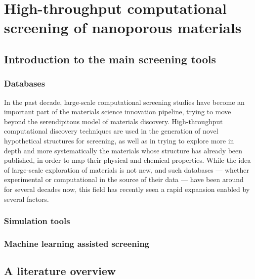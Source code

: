 \documentclass[main]{subfiles}
\begin{document}
\chapter{High-throughput computational screening of nanoporous materials}
\vspace*{-1\baselineskip}


\section{Introduction to the main screening tools}

\subsection{Databases}


In the past decade, large-scale computational screening studies have become an important part of the materials science innovation pipeline,\cite{Hautier_2019, Cole_2020} trying to move beyond the serendipitous model of materials discovery.\cite{Ludwig_2019, Stein_2019} High-throughput computational discovery techniques are used in the generation of novel hypothetical structures for screening,\cite{Wilmer_2011, Boyd_2016} as well as in trying to explore more in depth and more systematically the materials whose structure has already been published, in order to map their physical and chemical properties.\cite{GomezGualdron_2014,Moliner_2019,SalcedoPerez_2019} While the idea of large-scale exploration of materials is not new, and such databases --- whether experimental or computational in the source of their data --- have been around for several decades now,\cite{PDB_1971, Grazulis_2009, Groom_2016} this field has recently seen a rapid expansion enabled by several factors.

\subsection{Simulation tools}

\subsection{Machine learning assisted screening}


\section{A literature overview}
\end{document}
